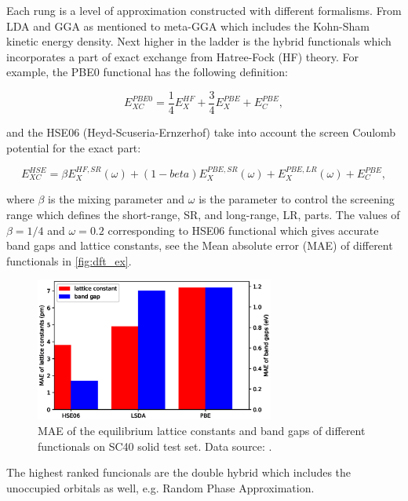 Each rung is a level of approximation constructed with different formalisms. From LDA and GGA as mentioned to meta-GGA which includes the Kohn-Sham kinetic energy density. Next higher in the ladder is the hybrid functionals which incorporates a part of exact exchange from Hatree-Fock (HF) theory. For example, the PBE0 functional\cite{Carlo1999} has the following definition:

\begin{equation}
E_{XC}^{PBE0}=\frac{1}{4}E_X^{HF}+\frac{3}{4}E_X^{PBE}+E_C^{PBE},
\end{equation}

and the HSE06 (Heyd-Scuseria-Ernzerhof)\cite{Jochen2003} take into account the screen Coulomb potential for the exact part:

\begin{equation}
E_{XC}^{HSE}=\beta E_X^{HF,SR}(\omega)+(1-beta)E_X^{PBE,SR}(\omega)+E_X^{PBE,LR}(\omega)+E_C^{PBE},
\end{equation}

where $\beta$ is the mixing parameter and $\omega$ is the parameter to control the screening range which defines the short-range, SR, and long-range, LR, parts. The values of $\beta=1/4$ and $\omega=0.2$ corresponding to HSE06 functional which gives accurate band gaps and lattice constants, see the Mean absolute error (MAE) of different functionals in \autoref{fig:dft_ex}. 


\begin{figure}[htbp!] 
\centering  
\includegraphics[width=0.7\textwidth]{lat_ex.eps}
\caption{ MAE of the equilibrium lattice constants and band gaps of different functionals on SC40 solid test set. Data source: \cite{Lucero2012}.}  
\label{fig:dft_ex}
\end{figure} 

The highest ranked funcionals are the double hybrid which includes the unoccupied orbitals as well, e.g. Random Phase Approximation\cite{Langreth1980}. 

